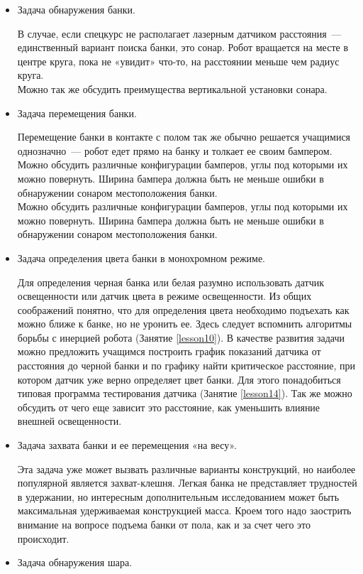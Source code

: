 \begin{itemize}
	\renewcommand{\labelitemi}{\stepcounter{tasksKingHill}\thetasksKingHill)}
	\item Задача обнаружения банки.
	
	В случае, если спецкурс не располагает лазерным датчиком расстояния~--- единственный вариант поиска банки, это сонар. Робот вращается на месте в центре круга, пока не «увидит» что-то, на расстоянии меньше чем радиус круга.\\
	Можно так же обсудить преимущества вертикальной установки сонара. 
	\item Задача перемещения банки.
	
	Перемещение банки в контакте с полом так же обычно решается учащимися однозначно~--- робот едет прямо на банку и толкает ее своим бампером.
	Можно обсудить различные конфигурации бамперов, углы под которыми их можно повернуть. Ширина бампера должна быть не меньше ошибки в обнаружении сонаром местоположения банки.\\
	Можно обсудить различные конфигурации бамперов, углы под которыми их можно повернуть. Ширина бампера должна быть не меньше ошибки в обнаружении сонаром местоположения банки.
	\item  Задача определения цвета банки в монохромном режиме.
	
	Для определения черная банка или белая разумно использовать датчик освещенности или датчик цвета в режиме освещенности. Из общих соображений понятно, что для определения цвета необходимо подъехать как можно ближе к банке, но не уронить ее. Здесь следует вспомнить алгоритмы борьбы с инерцией робота (Занятие \ref{lesson10}). В качестве развития задачи можно предложить учащимся построить график показаний датчика от расстояния до черной банки и по графику найти  критическое расстояние, при котором датчик уже верно определяет цвет банки. Для этого понадобиться типовая программа тестирования датчика (Занятие \ref{lesson14}). Так же можно обсудить от чего еще зависит это расстояние, как уменьшить влияние внешней освещенности.
	\item Задача захвата банки и ее перемещения «на весу».
	
	Эта задача уже может вызвать различные варианты конструкций, но наиболее популярной является захват-клешня. Легкая банка не представляет трудностей в удержании, но интересным дополнительным исследованием может быть максимальная удерживаемая конструкцией масса. Кроем того надо заострить внимание на вопросе подъема банки от пола, как и за счет чего это происходит.
	\item Задача обнаружения шара.
	

\end{itemize}

